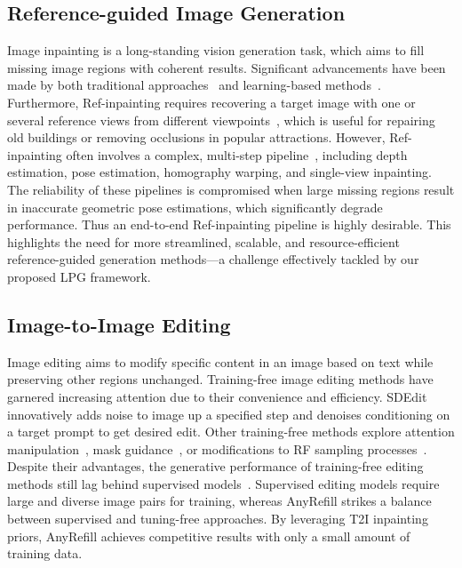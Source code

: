 \subsection{Reference-guided Image Generation}
Image inpainting is a long-standing vision generation task, which aims to fill missing image regions with coherent results. Significant advancements have been made by both traditional approaches~\cite{bertalmio2000image,criminisi2003object,hays2007scene} and learning-based methods~\cite{zeng2020high,zhao2021large,li2022mat,suvorov2022resolution,dong2022incremental}.
Furthermore, Ref-inpainting requires recovering a target image with one or several reference views from different viewpoints~\cite{tang2024realfill,oh2019onion}, which is useful for repairing old buildings or removing occlusions in popular attractions. However, Ref-inpainting often involves a complex, multi-step pipeline~\cite{zhou2021transfill,zhao2022geofill,zhao20223dfill}, including depth estimation, pose estimation, homography warping, and single-view inpainting.
The reliability of these pipelines is compromised when large missing regions result in inaccurate geometric pose estimations, which significantly degrade performance. Thus an end-to-end Ref-inpainting pipeline is highly desirable. This highlights the need for more streamlined, scalable, and resource-efficient reference-guided generation methods—a challenge effectively tackled by our proposed LPG framework.

\subsection{Image-to-Image Editing}
Image editing aims to modify specific content in an image based on text while preserving other regions unchanged. Training-free image editing methods have garnered increasing attention due to their convenience and efficiency. SDEdit~\cite{meng2021sdedit} innovatively adds noise to image up a specified step and denoises conditioning on a target prompt to get desired edit. Other training-free methods explore attention manipulation~\cite{hertz2022prompt,mokady2023null,parmar2023zero,dalva2024fluxspace}, mask guidance~\cite{avrahami2022blended,couairon2022diffedit,huang2023region,li2024zone}, or modifications to RF sampling processes~\cite{rout2024semantic,wang2024taming,kulikov2024flowedit}. Despite their advantages, the generative performance of training-free editing methods still lag behind supervised models~\cite{brooks2023instructpix2pix,sheynin2024emu,zhang2024hive,zhang2024magicbrush,shi2024seededit}. Supervised editing models require large and diverse image pairs for training, whereas AnyRefill strikes a balance between supervised and tuning-free approaches. By leveraging T2I inpainting priors, AnyRefill achieves competitive results with only a small amount of training data.

